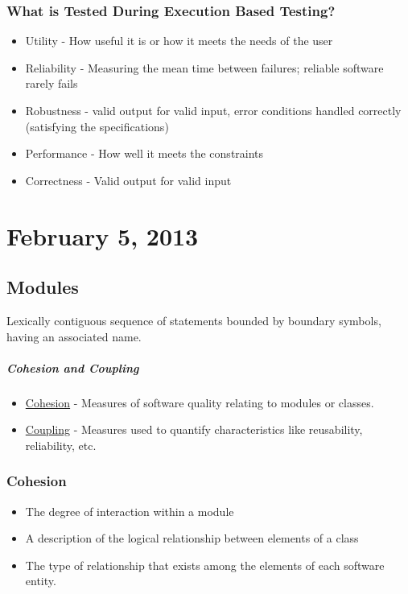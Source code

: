 \documentclass{report}
\begin{document}
			\subsection{What is Tested During Execution Based Testing?}
				\begin{itemize}
					\item Utility - How useful it is or how it meets the needs of the user
					\item Reliability - Measuring the mean time between failures; reliable software rarely fails
					\item Robustness - valid output for valid input, error conditions handled correctly (satisfying the specifications)
					\item Performance - How well it meets the constraints
					\item Correctness - Valid output for valid input
				\end{itemize}
	\chapter{February 5, 2013}
		\section{Modules}
			Lexically contiguous sequence of statements bounded by boundary symbols, having an associated name.
			\paragraph{Cohesion and Coupling}
				\begin{itemize}
					\item \underline{Cohesion} - Measures of software quality relating to modules or classes.
					\item \underline{Coupling} - Measures used to quantify characteristics like reusability, reliability, etc.
				\end{itemize}
			\subsection{Cohesion}
				\begin{itemize}
					\item The degree of interaction within a module
					\item A description of the logical relationship between elements of a class
					\item The type of relationship that exists among the elements of each software entity.
				\end{itemize}
\end{document}
